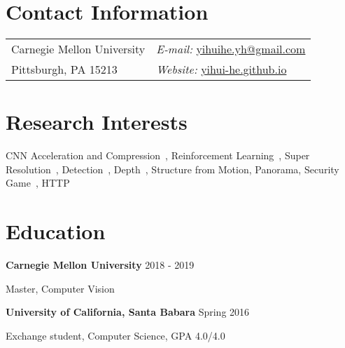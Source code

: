 \documentclass[margin,line]{res}
\newenvironment{list1}{
  \begin{list}{\ding{113}}{%
      \setlength{\itemsep}{0in}
      \setlength{\parsep}{0in} \setlength{\parskip}{0in}
      \setlength{\topsep}{0in} \setlength{\partopsep}{0in} 
      \setlength{\leftmargin}{0.17in}}}{\end{list}}
\begin{document}
\nocite{*}


\begin{resume}
\section{\sc Contact Information}
\vspace{.05in}
\begin{tabular}{@{}p{2in}p{4in}}        
Carnegie Mellon University & {\it E-mail:}  
\href{mailto:yihuihe.yh@gmail.com}{yihuihe.yh@gmail.com}\\       
Pittsburgh, PA 15213  & {\it Website:} 
\href{http://yihui-he.github.io/}{yihui-he.github.io} \\     
\end{tabular}


\section{\sc Research Interests}
CNN Acceleration and Compression~\cite{He_2017_ICCV,adc,tpami}, 
Reinforcement Learning~\cite{adc}, 
Super Resolution~\cite{liang2017single}, 
Detection~\cite{He_2017_ICCV}, 
Depth~\cite{he2017estimated}, 
Structure from Motion, Panorama, 
Security Game~\cite{ma2017vehicle}, 
HTTP~\cite{pid}
\section{\sc Education}
{\bf Carnegie Mellon University} \hfill {2018 - 2019}\\
\vspace*{-.1in}
\begin{list1}
\item[] Master, Computer Vision
\end{list1}

{\bf University of California, Santa Babara} \hfill {Spring 2016}\\
\vspace*{-.1in}
\begin{list1}
\item[] Exchange student, Computer Science, GPA 4.0/4.0
\end{list1}


\end{resume}
\end{document}
